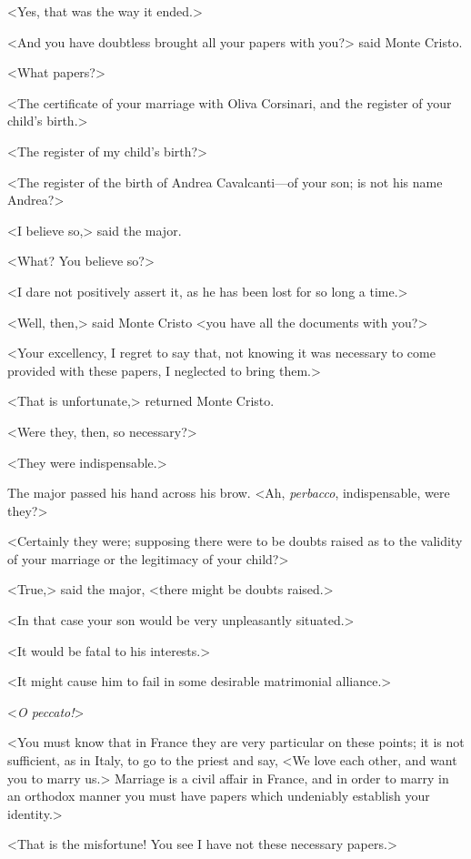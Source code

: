  <Yes, that was the way it ended.> 

 <And you have doubtless brought all your papers with you?> said Monte Cristo. 

 <What papers?> 

 <The certificate of your marriage with Oliva Corsinari, and the register of your child's birth.> 

 <The register of my child's birth?> 

 <The register of the birth of Andrea Cavalcanti—of your son; is not his name Andrea?> 

 <I believe so,> said the major. 

 <What? You believe so?> 

 <I dare not positively assert it, as he has been lost for so long a time.> 

 <Well, then,> said Monte Cristo <you have all the documents with you?> 

 <Your excellency, I regret to say that, not knowing it was necessary to come provided with these papers, I neglected to bring them.> 

 <That is unfortunate,> returned Monte Cristo. 

 <Were they, then, so necessary?> 

 <They were indispensable.> 

 The major passed his hand across his brow. <Ah, \textit{perbacco}, indispensable, were they?> 

 <Certainly they were; supposing there were to be doubts raised as to the validity of your marriage or the legitimacy of your child?> 

 <True,> said the major, <there might be doubts raised.> 

 <In that case your son would be very unpleasantly situated.> 

 <It would be fatal to his interests.> 

 <It might cause him to fail in some desirable matrimonial alliance.> 

 <\textit{O peccato!}> 

 <You must know that in France they are very particular on these points; it is not sufficient, as in Italy, to go to the priest and say, <We love each other, and want you to marry us.> Marriage is a civil affair in France, and in order to marry in an orthodox manner you must have papers which undeniably establish your identity.> 

 <That is the misfortune! You see I have not these necessary papers.> 

